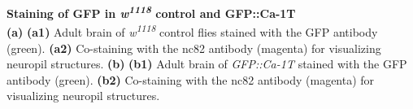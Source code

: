 \label{fig:S1} 
\textbf{Staining of GFP in \emph{w\textsuperscript{1118}} control and GFP::Ca-\alpha1T}
\\ 
\textbf{(a)} \textbf{(a1)} Adult brain of \emph{w\textsuperscript{1118}} control flies stained with the GFP antibody (green).
\textbf{(a2)} Co-staining with the nc82 antibody (magenta) for visualizing neuropil structures.
\textbf{(b)} \textbf{(b1)} Adult brain of \emph{GFP::Ca-\alpha1T} stained with the GFP antibody (green).
\textbf{(b2)} Co-staining with the nc82 antibody (magenta) for visualizing neuropil structures.